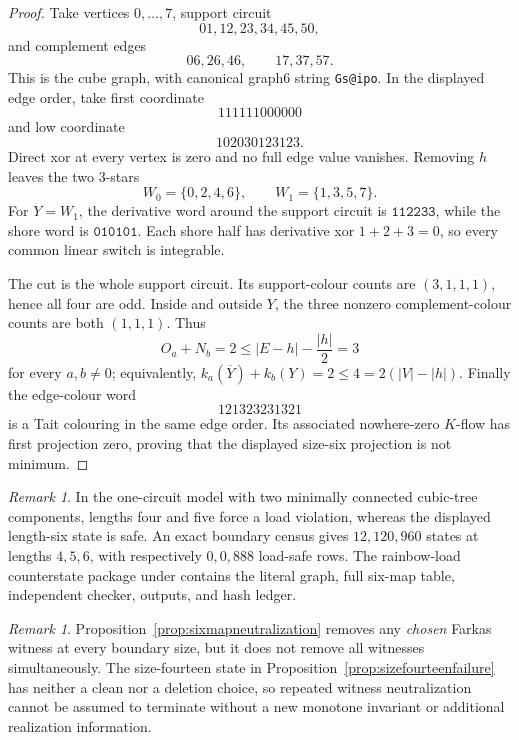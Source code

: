 \documentclass[11pt]{article}
\theoremstyle{definition}
\theoremstyle{remark}
\newtheorem{remark}[theorem]{Remark}
\begin{document}
\begin{proof}
Take vertices \(0,\ldots,7\), support circuit
\[
  01,12,23,34,45,50,
\]
and complement edges
\[
  06,26,46,\qquad17,37,57.
\]
This is the cube graph, with canonical graph6 string
\texttt{Gs@ipo}.  In the displayed edge order, take first coordinate
\[
                  111111000000
\]
and low coordinate
\[
                  102030123123.
\]
Direct xor at every vertex is zero and no full edge value vanishes.
Removing \(h\) leaves the two 3-stars
\[
 W_0=\{0,2,4,6\},\qquad W_1=\{1,3,5,7\}.
\]
For \(Y=W_1\), the derivative word around the support circuit is
\(\texttt{112233}\), while the shore word is
\(\texttt{010101}\).  Each shore half has derivative xor
\(1+2+3=0\), so every common linear switch is integrable.

The cut is the whole support circuit.  Its support-colour counts are
\((3,1,1,1)\), hence all four are odd.  Inside and outside \(Y\), the
three nonzero complement-colour counts are both \((1,1,1)\).  Thus
\[
 O_a+N_b=2\le |E-h|-\frac{|h|}{2}=3
\]
for every \(a,b\ne0\); equivalently,
\(k_a(\overline Y)+k_b(Y)=2\le4=2(|V|-|h|)\).
Finally the edge-colour word
\[
                  121323231321
\]
is a Tait colouring in the same edge order.  Its associated
nowhere-zero \(K\)-flow has first projection zero, proving that the
displayed size-six projection is not minimum.
\end{proof}

\begin{remark}
\begin{sloppypar}
In the one-circuit model with two minimally connected cubic-tree
components, lengths four and five force a load violation, whereas the
displayed length-six state is safe.  An exact boundary census gives
\(12,120,960\) states at lengths \(4,5,6\), with respectively
\(0,0,888\) load-safe rows.  The rainbow-load counterstate package under
 contains the literal graph, full six-map table,
independent checker, outputs, and hash ledger.
\end{sloppypar}
\end{remark}

\begin{remark}
Proposition~\ref{prop:sixmapneutralization} removes any \emph{chosen}
Farkas witness at every boundary size, but it does not remove all witnesses
simultaneously.  The size-fourteen state in
Proposition~\ref{prop:sizefourteenfailure} has neither a clean nor a
deletion choice, so repeated witness neutralization cannot be assumed to
terminate without a new monotone invariant or additional realization
information.
\end{remark}
\end{document}

